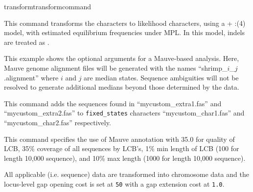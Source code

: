 \begin{command}{transform}{transformcommand}
\begin{poyexamples}
{This command transforms the characters to likelihood characters, using a  
+ :(4) model, with estimated equilibrium frequencies under 
MPL. In this model, indels are treated as .}

{This example shows the optional arguments for a Mauve-based  analysis.
Here, Mauve genome alignment files will be generated with the names ``shrimp\_$i$\_$j$.alignment'' 
where $i$ and $j$ are median states. Sequence ambiguities will not be resolved to generate 
additional medians beyond those determined by the data.}

{This command adds the sequences found in ``mycustom\_extra1.fas'' and ``mycustom\_extra2.fas'' 
to \texttt{fixed\_states} characters 
``mycustom\_char1.fas'' and ``mycustom\_char2.fas'' respectively.}

{This command specifies the use of Mauve annotation with 35.0 for quality of LCB,
35\% coverage of all sequences by LCB's, 1\% min length of LCB (100 for length 10,000 
sequence), and 10\% max length (1000 for length 10,000 sequence).}



{All applicable (i.e. sequence) data are transformed into chromosome
data and the locus-level gap opening cost is set at \texttt{50}
with a gap extension cost at \texttt{1.0}.}

\end{poyexamples}	  

\end{command}


